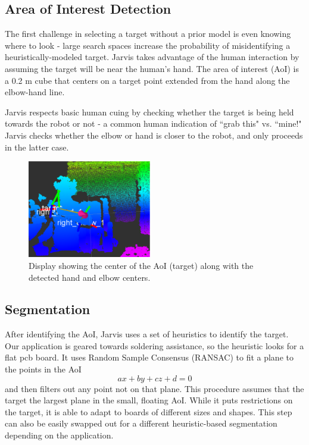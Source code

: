 \documentclass[10pt]{article}
\begin{document}
\subsection{Area of Interest Detection} \label{sec:aoi}
The first challenge in selecting a target without a prior model is even knowing where to look - large search spaces increase the probability of misidentifying a heuristically-modeled target. Jarvis takes advantage of the human interaction by assuming the target will be near the human's hand. The area of interest (AoI) is a 0.2 m cube that centers on a target point extended from the hand along the elbow-hand line.  
\par Jarvis respects basic human cuing by checking whether the target is being held towards the robot or not - a common human indication of ``grab this" vs. ``mine!" Jarvis checks whether the elbow or hand is closer to the robot, and only proceeds in the latter case. 

 \begin{figure}
\includegraphics[width=0.48\textwidth]{figures/frames.eps}  
\caption{Display showing the center of the AoI (target) along with the detected hand and elbow centers.}
\label{fig:frames}
\end{figure}
\subsection{Segmentation} \label{sec:segmentation}
After identifying the AoI, Jarvis uses a set of heuristics to identify the target. Our application is geared towards soldering assistance, so the heuristic looks for a flat pcb board. It uses Random Sample Consensus (RANSAC) to fit a plane to the points in the AoI
\begin{equation}
ax+by+cz+d=0 
\end{equation}
 and then filters out any point not on that plane. This procedure assumes that the target the largest plane in the small, floating AoI. While it puts restrictions on the target, it is able to adapt to boards of different sizes and shapes. This step can also be easily swapped out for a different heuristic-based segmentation depending on the application.  
\end{document}
